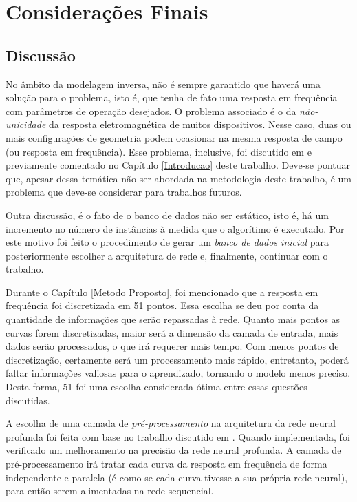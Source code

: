 \chapter{Considerações Finais}      \label{Consideracoes Finais}

\section{Discussão}

No âmbito da modelagem inversa, não é sempre garantido que haverá uma solução para o problema, isto é, que tenha de fato uma resposta em frequência com parâmetros de operação desejados. O problema associado é o da \textit{não-unicidade} da resposta eletromagnética de muitos dispositivos. Nesse caso, duas ou mais configurações de geometria podem ocasionar na mesma resposta de campo (ou resposta em frequência). Esse problema, inclusive, foi discutido em \cite{liu2018training} e previamente comentado no Capítulo \ref{Introducao} deste trabalho. Deve-se pontuar que, apesar dessa temática não ser abordada na metodologia deste trabalho, é um problema que deve-se considerar para trabalhos futuros.

Outra discussão, é o fato de o banco de dados não ser estático, isto é, há um incremento no número de instâncias à medida que o algorítimo é executado. Por este motivo foi feito o procedimento de gerar um \textit{banco de dados inicial} para posteriormente escolher a arquitetura de rede e, finalmente, continuar com o trabalho.

Durante o Capítulo \ref{Metodo Proposto}, foi mencionado que a resposta em frequência foi discretizada em 51 pontos. Essa escolha se deu por conta da quantidade de informações que serão repassadas à rede. Quanto mais pontos as curvas forem discretizadas, maior será a dimensão da camada de entrada, mais dados serão processados, o que irá requerer mais tempo. Com menos pontos de discretização, certamente será um processamento mais rápido, entretanto, poderá faltar informações valiosas para o aprendizado, tornando o modelo menos preciso. Desta forma, 51 foi uma escolha considerada ótima entre essas questões discutidas.

A escolha de uma camada de \textit{pré-processamento} na arquitetura da rede neural profunda foi feita com base no trabalho discutido em \cite{malkiel2017deep}. Quando implementada, foi verificado um melhoramento na precisão da rede neural profunda. A camada de pré-processamento irá tratar cada curva da resposta em frequência de forma independente e paralela (é como se cada curva tivesse a sua própria rede neural), para então serem alimentadas na rede sequencial.

